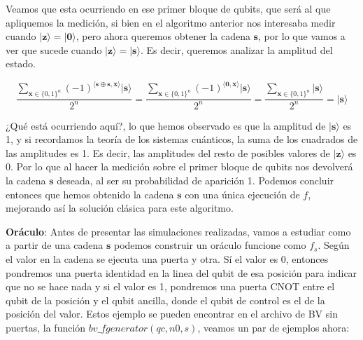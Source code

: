  \vspace{10pt}

 Veamos que esta ocurriendo en ese primer bloque de qubits, que será al que apliquemos la medición, si bien en el algoritmo anterior nos interesaba medir cuando $|\mathbf{z}\rangle=|\mathbf{0}\rangle$, pero ahora queremos obtener la cadena $\mathbf{s}$, por lo que vamos a ver que sucede cuando $|\mathbf{z}\rangle=|\mathbf{s}\rangle$. Es decir, queremos analizar la amplitud del estado.\newline

 \begin{equation}
    \dfrac{\sum_{\mathbf{x} \in \{0,1\}^{n}}(-1)^{\langle\mathbf{s}\oplus \mathbf{s},\mathbf{x}\rangle}|\mathbf{s}\rangle}{2^{n}} = \dfrac{\sum_{\mathbf{x} \in \{0,1\}^{n}}(-1)^{\langle\mathbf{0},\mathbf{x}\rangle}|\mathbf{s}\rangle}{2^{n}}= \dfrac{\sum_{\mathbf{x} \in \{0,1\}^{n}}|\mathbf{s}\rangle}{2^{n}} = |\mathbf{s}\rangle
 \end{equation}

 \newpage

 ¿Qué está ocurriendo aquí?, lo que hemos observado es que la amplitud de $|\mathbf{s}\rangle$ es 1, y si recordamos la teoría de los sistemas cuánticos, la suma de los cuadrados de las amplitudes es 1. Es decir, las amplitudes del resto de posibles valores de $|\mathbf{z}\rangle$ es 0. Por lo que al hacer la medición sobre el primer bloque de qubits nos devolverá la cadena $\mathbf{s}$ deseada, al ser su probabilidad de aparición 1. Podemos concluir entonces que hemos obtenido la cadena $\mathbf{s}$ con una única ejecución de $f$, mejorando así la solución clásica para este algoritmo.\newline

 
 \textbf{Oráculo}: Antes de presentar las simulaciones realizadas, vamos a estudiar como a partir de una cadena $\mathbf{s}$ podemos construir un oráculo funcione como $f_{s}$. Según el valor en la cadena se ejecuta una puerta y otra. Sí el valor es 0, entonces pondremos una puerta identidad en la linea del qubit de esa posición para indicar que no se hace nada y si el valor es 1, pondremos una puerta CNOT entre el qubit de la posición y el qubit ancilla, donde el qubit de control es el de la posición del valor. Estos ejemplo se pueden encontrar en el archivo de BV sin puertas, la función \textit{$bv\_fgenerator(qc,n0,s)$}, veamos un par de ejemplos ahora:
 
